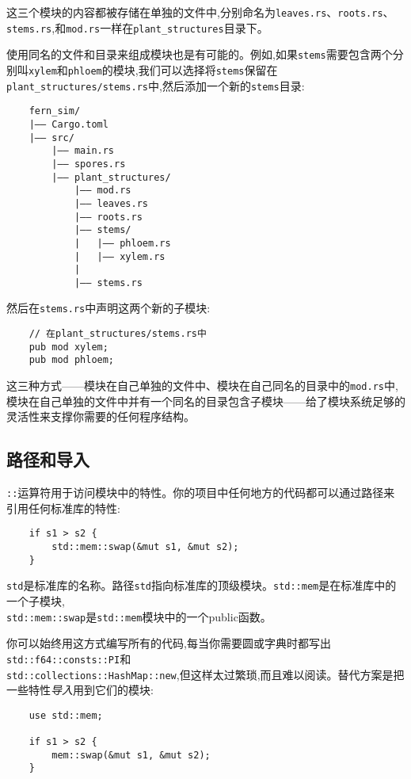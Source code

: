 这三个模块的内容都被存储在单独的文件中,分别命名为\texttt{leaves.rs}、\texttt{roots.rs}、\texttt{stems.rs},和\texttt{mod.rs}一样在\texttt{plant\_structures}目录下。

使用同名的文件和目录来组成模块也是有可能的。例如,如果\texttt{stems}需要包含两个分别叫\texttt{xylem}和\texttt{phloem}的模块,我们可以选择将\texttt{stems}保留在\texttt{plant\_structures/stems.rs}中,然后添加一个新的\texttt{stems}目录:
\begin{verbatim}
    fern_sim/
    |—— Cargo.toml
    |—— src/
        |—— main.rs
        |—— spores.rs
        |—— plant_structures/
            |—— mod.rs
            |—— leaves.rs
            |—— roots.rs
            |—— stems/
            |   |—— phloem.rs
            |   |—— xylem.rs
            |
            |—— stems.rs
\end{verbatim}

然后在\texttt{stems.rs}中声明这两个新的子模块:
\begin{verbatim}
    // 在plant_structures/stems.rs中
    pub mod xylem;
    pub mod phloem;
\end{verbatim}

这三种方式——模块在自己单独的文件中、模块在自己同名的目录中的\texttt{mod.rs}中,模块在自己单独的文件中并有一个同名的目录包含子模块——给了模块系统足够的灵活性来支撑你需要的任何程序结构。

\subsection{路径和导入}
\texttt{::}运算符用于访问模块中的特性。你的项目中任何地方的代码都可以通过路径来引用任何标准库的特性:
\begin{verbatim}
    if s1 > s2 {
        std::mem::swap(&mut s1, &mut s2);
    }
\end{verbatim}

\texttt{std}是标准库的名称。路径\texttt{std}指向标准库的顶级模块。\texttt{std::mem}是在标准库中的一个子模块,\\
\texttt{std::mem::swap}是\texttt{std::mem}模块中的一个public函数。

你可以始终用这方式编写所有的代码,每当你需要圆或字典时都写出\texttt{std::f64::consts::PI}和\\
\texttt{std::collections::HashMap::new},但这样太过繁琐,而且难以阅读。替代方案是把一些特性\emph{导入}用到它们的模块:
\begin{verbatim}
    use std::mem;

    if s1 > s2 {
        mem::swap(&mut s1, &mut s2);
    }
\end{verbatim}

